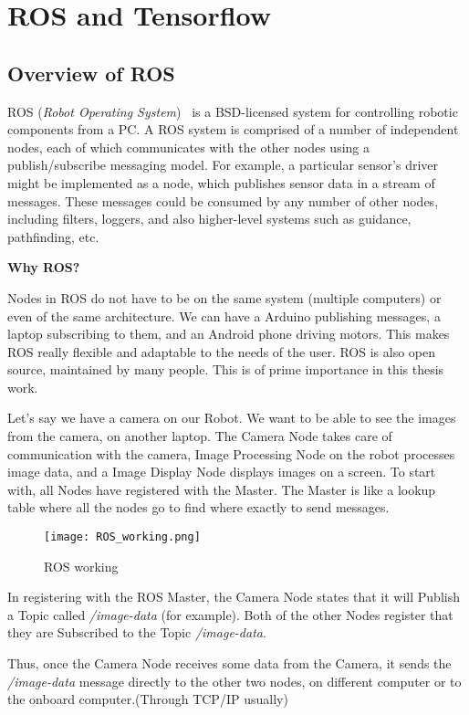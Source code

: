 \chapter{ROS and Tensorflow}

	\section{Overview of ROS}
	\label{sec:Overview of ROS}
		ROS (\emph{Robot Operating System})~\cite{ros} is a BSD-licensed system for controlling robotic components from a PC. A ROS system is comprised of a number of independent nodes, each of which communicates with the other nodes using a publish/subscribe messaging model. For example, a particular sensor’s driver might be implemented as a node, which publishes sensor data in a stream of messages. These messages could be consumed by any number of other nodes, including filters, loggers, and also higher-level systems such as guidance, pathfinding, etc.
		
		\textbf{Why ROS?}
		
		Nodes in ROS do not have to be on the same system (multiple computers) or even of the same architecture. We can have a Arduino publishing messages, a laptop subscribing to them, and an Android phone driving motors. This makes ROS really flexible and adaptable to the needs of the user. ROS is also open source, maintained by many people. This is of prime importance in this thesis work.
		
		Let’s say we have a camera on our Robot. We want to be able to see the images from the camera, on another laptop. The Camera Node takes care of communication with the camera, Image Processing Node on the robot processes image data, and a Image Display Node displays images on a screen. To start with, all Nodes have registered with the Master. The Master is like a lookup table where all the nodes go to find where exactly to send messages.
		
		\begin{figure}[htbp]
			\centering
			\texttt{[image: ROS\_working.png]}
			\caption{ROS working\label{ROS working}}
		\end{figure}
		
		In registering with the ROS Master, the Camera Node states that it will Publish a Topic called \emph{/image-data} (for example). Both of the other Nodes register that they are Subscribed to the Topic \emph{/image-data}.
		
		Thus, once the Camera Node receives some data from the Camera, it sends the \emph{/image-data} message directly to the other two nodes, on different computer or to the onboard computer.(Through TCP/IP usually)
	
